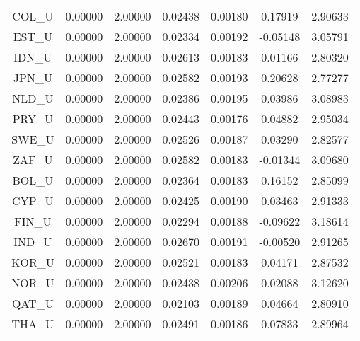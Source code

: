 \begin{longtable}{c c c c c c c}
COL_U & 0.00000 & 2.00000 & 0.02438 & 0.00180 & 0.17919 & 2.90633 \\
EST_U & 0.00000 & 2.00000 & 0.02334 & 0.00192 & -0.05148 & 3.05791 \\
IDN_U & 0.00000 & 2.00000 & 0.02613 & 0.00183 & 0.01166 & 2.80320 \\
JPN_U & 0.00000 & 2.00000 & 0.02582 & 0.00193 & 0.20628 & 2.77277 \\
NLD_U & 0.00000 & 2.00000 & 0.02386 & 0.00195 & 0.03986 & 3.08983 \\
PRY_U & 0.00000 & 2.00000 & 0.02443 & 0.00176 & 0.04882 & 2.95034 \\
SWE_U & 0.00000 & 2.00000 & 0.02526 & 0.00187 & 0.03290 & 2.82577 \\
ZAF_U & 0.00000 & 2.00000 & 0.02582 & 0.00183 & -0.01344 & 3.09680 \\
BOL_U & 0.00000 & 2.00000 & 0.02364 & 0.00183 & 0.16152 & 2.85099 \\
CYP_U & 0.00000 & 2.00000 & 0.02425 & 0.00190 & 0.03463 & 2.91333 \\
FIN_U & 0.00000 & 2.00000 & 0.02294 & 0.00188 & -0.09622 & 3.18614 \\
IND_U & 0.00000 & 2.00000 & 0.02670 & 0.00191 & -0.00520 & 2.91265 \\
KOR_U & 0.00000 & 2.00000 & 0.02521 & 0.00183 & 0.04171 & 2.87532 \\
NOR_U & 0.00000 & 2.00000 & 0.02438 & 0.00206 & 0.02088 & 3.12620 \\
QAT_U & 0.00000 & 2.00000 & 0.02103 & 0.00189 & 0.04664 & 2.80910 \\
THA_U & 0.00000 & 2.00000 & 0.02491 & 0.00186 & 0.07833 & 2.89964 \\
\end{longtable}
